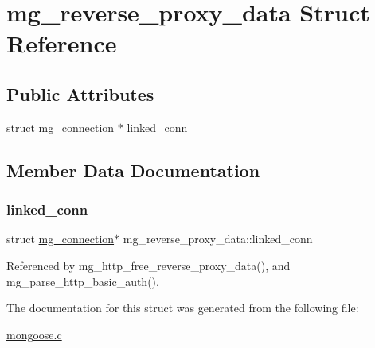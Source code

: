 \hypertarget{structmg__reverse__proxy__data}{}\section{mg\+\_\+reverse\+\_\+proxy\+\_\+data Struct Reference}
\label{structmg__reverse__proxy__data}
\subsection*{Public Attributes}
\begin{DoxyCompactItemize}
\item 
struct \hyperlink{structmg__connection}{mg\+\_\+connection} $\ast$ \hyperlink{structmg__reverse__proxy__data_a085cf094cf2e4a4bd80c8082443821b5_a085cf094cf2e4a4bd80c8082443821b5}{linked\+\_\+conn}
\end{DoxyCompactItemize}


\subsection{Member Data Documentation}
\mbox{\label{structmg__reverse__proxy__data_a085cf094cf2e4a4bd80c8082443821b5_a085cf094cf2e4a4bd80c8082443821b5}} 
\subsubsection{\texorpdfstring{linked\+\_\+conn}{linked\_conn}}
{\footnotesize\ttfamily struct \hyperlink{structmg__connection}{mg\+\_\+connection}$\ast$ mg\+\_\+reverse\+\_\+proxy\+\_\+data\+::linked\+\_\+conn}



Referenced by mg\+\_\+http\+\_\+free\+\_\+reverse\+\_\+proxy\+\_\+data(), and mg\+\_\+parse\+\_\+http\+\_\+basic\+\_\+auth().



The documentation for this struct was generated from the following file\+:\begin{DoxyCompactItemize}
\item 
\hyperlink{mongoose_8c}{mongoose.\+c}\end{DoxyCompactItemize}
